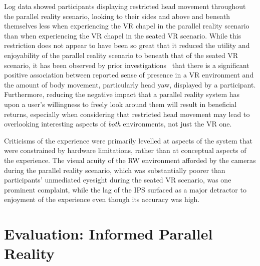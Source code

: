 Log data showed participants displaying restricted head movement throughout the parallel reality scenario, looking to their sides and above and beneath themselves less when experiencing the VR chapel in the parallel reality scenario than when experiencing the VR chapel in the seated VR scenario. While this restriction does not appear to have been so great that it reduced the utility and enjoyability of the parallel reality scenario to beneath that of the seated VR scenario, it has been observed by prior investigations~\cite{Slater1998} that there is a significant positive association between reported sense of presence in a VR environment and the amount of body movement, particularly head yaw, displayed by a participant. Furthermore, reducing the negative impact that a parallel reality system has upon a user's willingness to freely look around them will result in beneficial returns, especially when considering that restricted head movement may lead to overlooking interesting aspects of \textit{both} environments, not just the VR one.

Criticisms of the experience were primarily levelled at aspects of the system that were constrained by hardware limitations, rather than at conceptual aspects of the experience. The visual acuity of the RW environment afforded by the cameras during the parallel reality scenario, which was substantially poorer than participants' unmediated eyesight during the seated VR scenario, was one prominent complaint, while the lag of the IPS surfaced as a major detractor to enjoyment of the experience even though its accuracy was high.



\chapter{Evaluation: Informed Parallel Reality}



